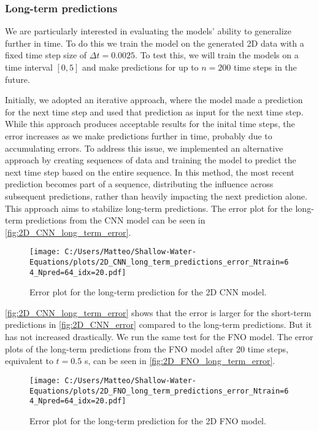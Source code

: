 \subsubsection*{Long-term predictions}
We are particularly interested in evaluating the models' ability to generalize further in time.
To do this we train the model on the generated 2D data with a fixed time step size of $\Delta t = 0.0025$.
To test this, we will train the models on a time interval $[0, 5]$ and make predictions for up to $n = 200$ time steps in the future.

Initially, we adopted an iterative approach, where the model made a prediction for the next time step and used that prediction as input for the next time step.
While this approach produces acceptable results for the inital time steps, the error increases as we make predictions further in time, probably due to accumulating errors.
To address this issue, we implemented an alternative approach by creating sequences of data and training the model to predict the next time step based on the entire sequence.
In this method, the most recent prediction becomes part of a sequence, distributing the influence across subsequent predictions, rather than heavily impacting the next prediction alone.
This approach aims to stabilize long-term predictions.
The error plot for the long-term predictions from the CNN model can be seen in \autoref{fig:2D_CNN_long_term_error}.
\begin{figure}[H]
    \centering
    \texttt{[image: C:/Users/Matteo/Shallow-Water-Equations/plots/2D\_CNN\_long\_term\_predictions\_error\_Ntrain=64\_Npred=64\_idx=20.pdf]}
    \caption{Error plot for the long-term prediction for the 2D CNN model.}\label{fig:2D_CNN_long_term_error}
\end{figure}
\autoref{fig:2D_CNN_long_term_error} shows that the error is larger for the short-term predictions in \autoref{fig:2D_CNN_error} compared to the long-term predictions.
But it has not increased drastically.
We run the same test for the FNO model.
The error plots of the long-term predictions from the FNO model after 20 time steps, equivalent to $t = 0.5$ s, can be seen in \autoref{fig:2D_FNO_long_term_error}.
\begin{figure}[H]
    \centering
    \texttt{[image: C:/Users/Matteo/Shallow-Water-Equations/plots/2D\_FNO\_long\_term\_predictions\_error\_Ntrain=64\_Npred=64\_idx=20.pdf]}
    \caption{Error plot for the long-term prediction for the 2D FNO model.}\label{fig:2D_FNO_long_term_error}
\end{figure}
